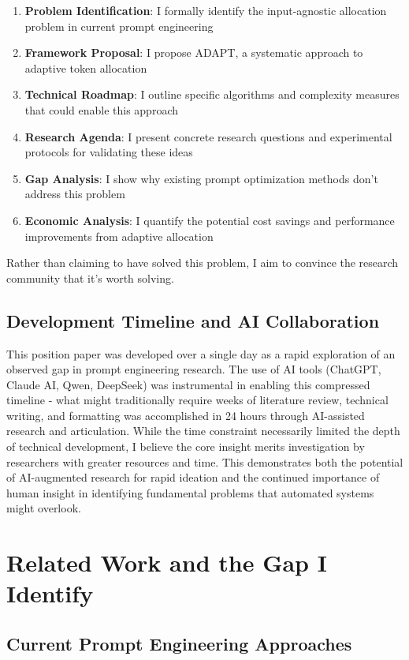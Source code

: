 \documentclass[11pt,a4paper]{article}
\begin{document}
\begin{enumerate}
\item \textbf{Problem Identification}: I formally identify the input-agnostic allocation problem in current prompt engineering
\item \textbf{Framework Proposal}: I propose ADAPT, a systematic approach to adaptive token allocation
\item \textbf{Technical Roadmap}: I outline specific algorithms and complexity measures that could enable this approach
\item \textbf{Research Agenda}: I present concrete research questions and experimental protocols for validating these ideas
\item \textbf{Gap Analysis}: I show why existing prompt optimization methods don't address this problem
\item \textbf{Economic Analysis}: I quantify the potential cost savings and performance improvements from adaptive allocation
\end{enumerate}

Rather than claiming to have solved this problem, I aim to convince the research community that it's worth solving.

\subsection{Development Timeline and AI Collaboration}
This position paper was developed over a single day as a rapid exploration of an observed gap in prompt engineering research. The use of AI tools (ChatGPT, Claude AI, Qwen, DeepSeek) was instrumental in enabling this compressed timeline - what might traditionally require weeks of literature review, technical writing, and formatting was accomplished in 24 hours through AI-assisted research and articulation. While the time constraint necessarily limited the depth of technical development, I believe the core insight merits investigation by researchers with greater resources and time. This demonstrates both the potential of AI-augmented research for rapid ideation and the continued importance of human insight in identifying fundamental problems that automated systems might overlook.

\section{Related Work and the Gap I Identify}

\subsection{Current Prompt Engineering Approaches}
\end{document}
